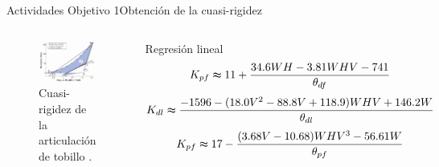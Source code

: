 \documentclass[10pt]{beamer}
\begin{document}
\begin{frame}{Actividades Objetivo 1}{Obtención de la cuasi-rigidez}
\begin{columns}[t]
\column{60 mm}
\begin{figure}
\begin{center}
\includegraphics[scale=0.3]{Feathergraphics/quasirigidez}
\caption{Cuasi-rigidez de la articulación de tobillo \cite{Shamaei2013}.}
\end{center}
\end{figure}

\column{55 mm}
\vspace{10 mm}
\begin{block}{\scriptsize {Regresión lineal}}
\begin{equation}
\scriptsize {K_{pf}\thickapprox 11+\frac{34.6WH-3.81WHV-741}{\theta_{df}}}
\end{equation}
\begin{equation}
\tiny {K_{dl}\thickapprox \frac{-1596-(18.0V^{2}-88.8V+118.9)WHV+146.2W}{\theta_{dl}}}
\end{equation}
\begin{equation}
\scriptsize {K_{pf}\thickapprox 17-\frac{(3.68V-10.68)WHV^{3}-56.61W}{\theta_{pf}}}
\end{equation}
\end{block}


\end{columns}

\end{frame}
\end{document}

